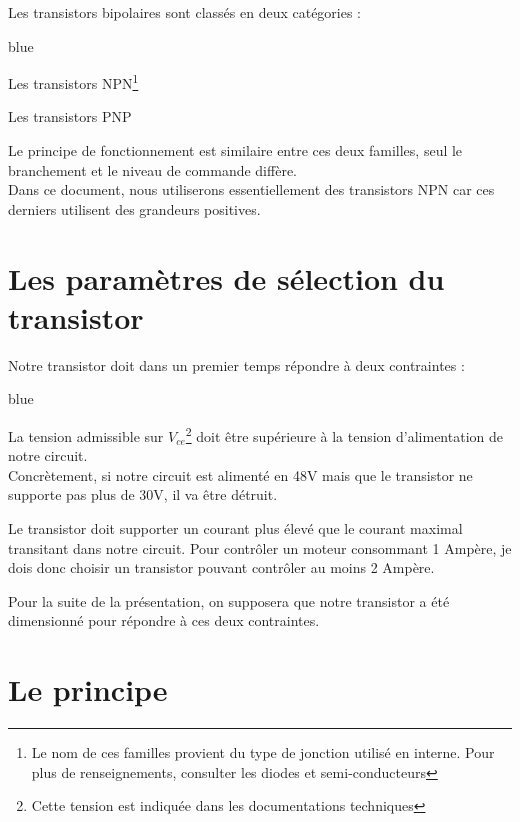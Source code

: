 Les transistors bipolaires sont classés en deux catégories : 

\begin{items}{blue}{\Triangle}

  \item Les transistors NPN\footnote{Le nom de ces familles provient du type de jonction utilisé en interne. Pour plus de renseignements, consulter les diodes et semi-conducteurs}
  \item Les transistors PNP

\end{items}

Le principe de fonctionnement est similaire entre ces deux familles, seul le branchement et le niveau de commande diffère.\\ Dans ce document, nous utiliserons essentiellement des transistors NPN car ces derniers utilisent des grandeurs positives.



\section{Les paramètres de sélection du transistor}

Notre transistor doit dans un premier temps répondre à deux contraintes : 

\begin{items}{blue}{\Triangle}

  \item La tension admissible sur $V_{ce}$\footnote{Cette tension est indiquée dans les documentations techniques} doit être supérieure à la tension d'alimentation de notre circuit.\\
  Concrètement, si notre circuit est alimenté en 48V mais que le transistor ne supporte pas plus de 30V, il va être détruit.
  \item Le transistor doit supporter un courant plus élevé que le courant maximal transitant dans notre circuit.
  Pour contrôler un moteur consommant 1 Ampère, je dois donc choisir un transistor pouvant contrôler au moins 2 Ampère.
\end{items}

Pour la suite de la présentation, on supposera que notre transistor a été dimensionné pour répondre à ces deux contraintes.


\section{Le principe}

